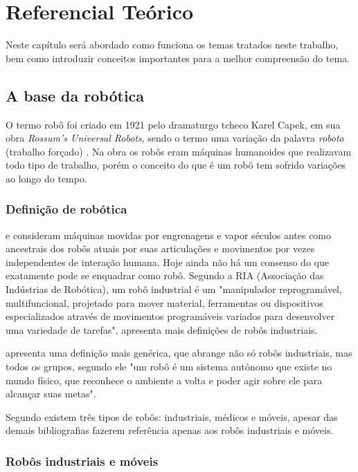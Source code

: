 \chapter[Referencial Teórico]{Referencial Teórico}

Neste capítulo será abordado como funciona os temas tratados neste trabalho, bem como introduzir conceitos importantes para a melhor compreensão do tema.

\section{A base da robótica}

O termo robô foi criado em 1921 pelo dramaturgo tcheco Karel Capek, em sua obra \textit{Rossum’s Universal Robots}, sendo o  termo uma variação da palavra \textit{robota} (trabalho forçado) \cite{Mataric2007}. Na obra os robôs eram máquinas humanoides que realizavam todo tipo de trabalho, porém o conceito do que é um robô tem sofrido variações ao longo do tempo. 

\subsection{Definição de robótica}

\cite{Mataric2007} e \cite{Abreu2001} consideram máquinas movidas por engrenagens e vapor séculos antes como ancestrais dos robôs atuais por suas articulações e movimentos por vezes independentes de interação humana. Hoje ainda não há um consenso do que exatamente pode se enquadrar como robô. Segundo a RIA (Associação das Indústrias de Robótica), um robô industrial é um "manipulador reprogramável, multifuncional, projetado para mover material, ferramentas ou dispositivos especializados através de movimentos programáveis variados para desenvolver uma variedade de tarefas". \cite{Abreu2001} apresenta mais definições de robôs industriais. 

\cite{Mataric2007} apresenta uma definição mais genérica, que abrange não só robôs industriais, mas todos os grupos, segundo ele "um robô é um sistema autônomo que existe no mundo físico, que reconhece o ambiente a volta e poder agir sobre ele para alcançar suas metas".

Segundo \cite{Secchi2008} existem três tipos de robôs: industriais, médicos e móveis, apesar das demais bibliografias fazerem referência apenas aos robôs industriais e móveis.

\subsection{Robôs industriais e móveis}

